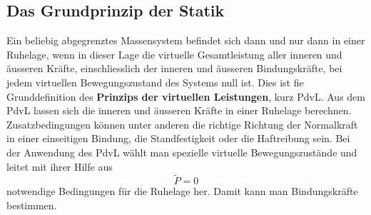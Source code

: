 \subsection{Das Grundprinzip der Statik}
Ein beliebig abgegrenztes Massensystem befindet sich dann und nur dann in einer Ruhelage, wenn in dieser Lage die virtuelle Gesamtleistung aller inneren und äusseren Kräfte, einschliesslich der inneren und äusseren Bindungskräfte, bei jedem virtuellen Bewegungszustand des Systems null ist. Dies ist fie Grunddefinition des \textbf{Prinzips der virtuellen Leistungen}, kurz PdvL.
\newline\newline
Aus dem PdvL lassen sich die inneren und äusseren Kräfte in einer Ruhelage berechnen. Zusatzbedingungen können unter anderen die richtige Richtung der Normalkraft in einer einseitigen Bindung, die Standfestigkeit oder die Haftreibung sein. Bei der Anwendung des PdvL wählt man spezielle virtuelle Bewegungszustände und leitet mit ihrer Hilfe aus 
\begin{equation}
\boxed{\tilde{P}=0} 
\end{equation}
notwendige Bedingungen für die Ruhelage her. Damit kann man Bindungskräfte bestimmen.
